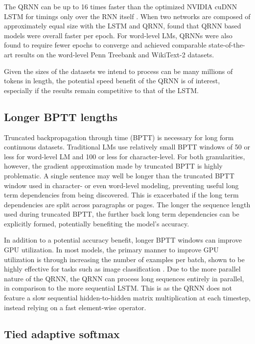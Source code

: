 \documentclass{article}
\begin{document}
The QRNN can be up to 16 times faster than the optimized NVIDIA cuDNN LSTM for timings only over the RNN itself \citep{Bradbury2016}.
When two networks are composed of approximately equal size with the LSTM and QRNN, \cite{merity2018regularizing} found that QRNN based models were overall  faster per epoch.
For word-level LMs, QRNNs were also found to require fewer epochs to converge and achieved comparable state-of-the-art results on the word-level Penn Treebank and WikiText-2 datasets.

Given the sizes of the datasets we intend to process can be many millions of tokens in length, the potential speed benefit of the QRNN is of interest, especially if the results remain competitive to that of the LSTM.

\subsection{Longer BPTT lengths}

Truncated backpropagation through time (BPTT) \citep{williams1990efficient,werbos1990backpropagation} is necessary for long form continuous datasets.
Traditional LMs use relatively small BPTT windows of 50 or less for word-level LM and 100 or less for character-level.
For both granularities, however, the gradient approximation made by truncated BPTT is highly problematic.
A single sentence may well be longer than the truncated BPTT window used in character- or even word-level modeling, preventing useful long term dependencies from being discovered.
This is exacerbated if the long term dependencies are split across paragraphs or pages.
The longer the sequence length used during truncated BPTT, the further back long term dependencies can be explicitly formed, potentially benefiting the model's accuracy.

In addition to a potential accuracy benefit, longer BPTT windows can improve GPU utilization.
In most models, the primary manner to improve GPU utilization is through increasing the number of examples per batch, shown to be highly effective for tasks such as image classification \citep{goyal2017accurate}.
Due to the more parallel nature of the QRNN, the QRNN can process long sequences entirely in parallel, in comparison to the more sequential LSTM.
This is as the QRNN does not feature a slow sequential hidden-to-hidden matrix multiplication at each timestep, instead relying on a fast element-wise operator.

\subsection{Tied adaptive softmax}
\end{document}
